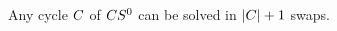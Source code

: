 \documentclass[msc,english,table,xcdraw]{ppgccufmg}
\begin{document}


\begin{lemma}
\label{lem:s_zerocycle}
Any cycle $C$ of $CS^{0}$ can be solved in $|C| + 1$ swaps.
\end{lemma}
\end{document}

